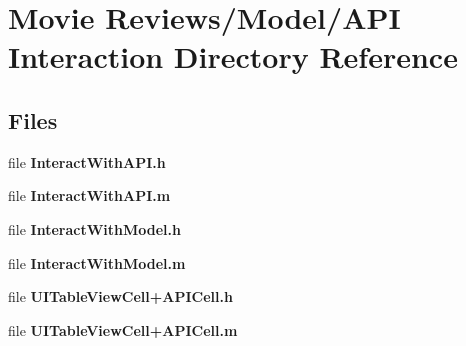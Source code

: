 \section{Movie Reviews/\+Model/\+A\+P\+I Interaction Directory Reference}
\label{dir_53c9f9811467bee08962c9f29fe1dbba}
\subsection*{Files}
\begin{DoxyCompactItemize}
\item 
file {\bfseries Interact\+With\+A\+P\+I.\+h}
\item 
file {\bfseries Interact\+With\+A\+P\+I.\+m}
\item 
file {\bfseries Interact\+With\+Model.\+h}
\item 
file {\bfseries Interact\+With\+Model.\+m}
\item 
file {\bfseries U\+I\+Table\+View\+Cell+\+A\+P\+I\+Cell.\+h}
\item 
file {\bfseries U\+I\+Table\+View\+Cell+\+A\+P\+I\+Cell.\+m}
\end{DoxyCompactItemize}
